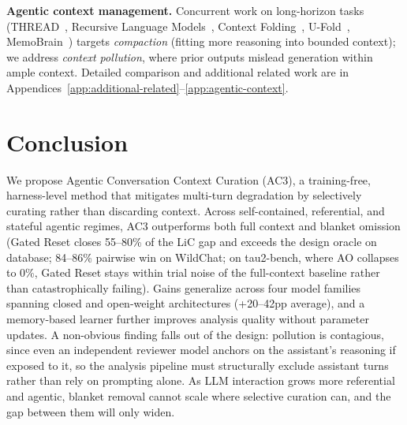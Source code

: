 \documentclass{article}
\newcommand{\methodfull}{Agentic Conversation Context Curation\xspace}
\newcommand{\method}{AC3\xspace}
\begin{document}
\noindent\textbf{Agentic context management.}
Concurrent work on long-horizon tasks (THREAD~\citep{schroeder2025thread}, Recursive Language Models~\citep{zhang2025rlm}, Context Folding~\citep{sun2025contextfolding}, U-Fold~\citep{su2026ufold}, MemoBrain~\citep{qian2026memobrain}) targets \emph{compaction} (fitting more reasoning into bounded context); we address \emph{context pollution}, where prior outputs mislead generation within ample context. Detailed comparison and additional related work are in Appendices~\ref{app:additional-related}--\ref{app:agentic-context}.


\section{Conclusion}
\label{sec:conclusion}

We propose \methodfull{} (\method), a training-free, harness-level method that mitigates multi-turn degradation by selectively curating rather than discarding context. Across self-contained, referential, and stateful agentic regimes, \method outperforms both full context and blanket omission (Gated Reset closes 55--80\% of the LiC gap and exceeds the design oracle on database; 84--86\% pairwise win on WildChat; on tau2-bench, where AO collapses to 0\%, Gated Reset stays within trial noise of the full-context baseline rather than catastrophically failing). Gains generalize across four model families spanning closed and open-weight architectures (+20--42pp average), and a memory-based learner further improves analysis quality without parameter updates. A non-obvious finding falls out of the design: pollution is contagious, since even an independent reviewer model anchors on the assistant's reasoning if exposed to it, so the analysis pipeline must structurally exclude assistant turns rather than rely on prompting alone. As LLM interaction grows more referential and agentic, blanket removal cannot scale where selective curation can, and the gap between them will only widen.


\begin{ack}
\end{ack}
\end{document}
